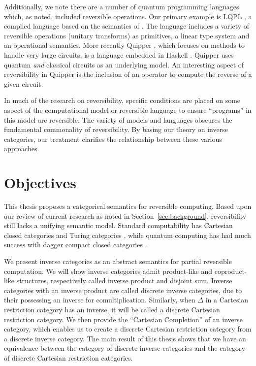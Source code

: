 Additionally, we note there are a number of quantum programming languages which, as noted, included
reversible operations. Our primary example is LQPL \cite{giles2007}, a compiled language based on the
semantics of \cite{selinger04:qpl}. The language includes a variety of reversible operations
(unitary transforms) as primitives, a linear type system and an operational semantics. More recently
Quipper \cite{green2013introduction,green2013quipper}, which focuses on methods to handle very large
circuits, is a language embedded in Haskell \cite{peyton2003:haskell98}. Quipper uses quantum
\emph{and} classical circuits as an underlying model. An interesting aspect of reversibility in
Quipper is the inclusion of an operator to compute the reverse of a given circuit.

In much of the research on reversibility, specific conditions are placed on some aspect of the
computational model or reversible language to ensure ``programs'' in this model are reversible.
The variety of models and languages obscures the fundamental commonality of reversibility.
By basing our theory on inverse categories, our treatment clarifies the relationship
between these various approaches.


\section{Objectives}
\label{sec:objectives}

This thesis proposes a categorical semantics for reversible computing. Based upon our review of
current research as noted in Section~\ref{sec:background}, reversibility still lacks a unifying
semantic model. Standard computability has Cartesian closed categories \cite{barr:ctcs} and Turing
categories \cite{cockett-hostra08-intro-to-turing}, while quantum computing has had much success
with dagger compact closed categories
\cite{selinger04:towardssemantics,selinger05:dagger,abramsky05:abstractscalars}.

We present inverse categories as an abstract semantics for partial reversible computation. We will
show inverse categories admit product-like and coproduct-like structures, respectively called
inverse product and disjoint sum. Inverse categories with an inverse product are called discrete
inverse categories, due to their possessing an inverse for comultiplication. Similarly, when
$\Delta$ in a Cartesian restriction category has an inverse, it will be called a discrete Cartesian
restriction category. We then provide the ``Cartesian Completion'' of an inverse category, which
enables us to create a discrete Cartesian restriction category from a discrete inverse category.
The main result of this thesis shows that we have an equivalence between the
category of discrete inverse categories and the category of discrete Cartesian restriction
categories.

